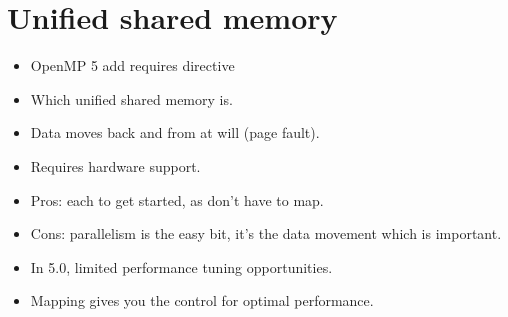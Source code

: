 \section{Unified shared memory}
\begin{itemize}
  \item OpenMP 5 add requires directive
  \item Which unified shared memory is.
  \item Data moves back and from at will (page fault).
  \item Requires hardware support.
  \item Pros: each to get started, as don't have to map.
  \item Cons: parallelism is the easy bit, it's the data movement which is important.
  \item In 5.0, limited performance tuning opportunities.
  \item Mapping gives you the control for optimal performance.
\end{itemize}

